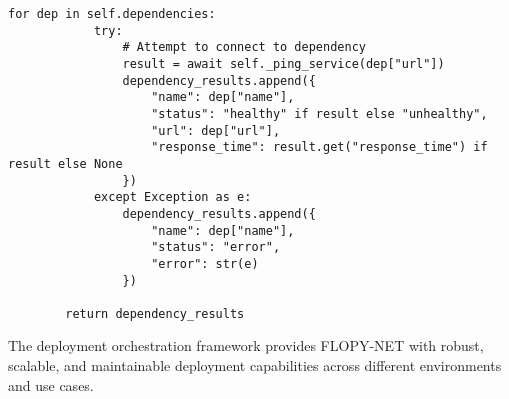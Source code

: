 \begin{lstlisting}[style=pythoncode, caption=Service Health Check Implementation]
        for dep in self.dependencies:
            try:
                # Attempt to connect to dependency
                result = await self._ping_service(dep["url"])
                dependency_results.append({
                    "name": dep["name"],
                    "status": "healthy" if result else "unhealthy",
                    "url": dep["url"],
                    "response_time": result.get("response_time") if result else None
                })
            except Exception as e:
                dependency_results.append({
                    "name": dep["name"],
                    "status": "error",
                    "error": str(e)
                })
        
        return dependency_results
\end{lstlisting}

The deployment orchestration framework provides FLOPY-NET with robust, scalable, and maintainable deployment capabilities across different environments and use cases.
